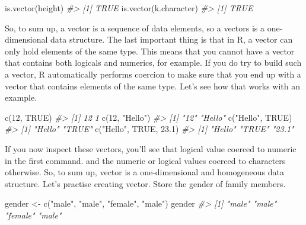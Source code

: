 \documentclass[
]{book}
\newenvironment{Shaded}{\begin{snugshade}}{\end{snugshade}}
\newcommand{\CommentTok}[1]{\textcolor[rgb]{0.56,0.35,0.01}{\textit{#1}}}
\newcommand{\ConstantTok}[1]{\textcolor[rgb]{0.00,0.00,0.00}{#1}}
\newcommand{\DecValTok}[1]{\textcolor[rgb]{0.00,0.00,0.81}{#1}}
\newcommand{\FloatTok}[1]{\textcolor[rgb]{0.00,0.00,0.81}{#1}}
\newcommand{\FunctionTok}[1]{\textcolor[rgb]{0.00,0.00,0.00}{#1}}
\newcommand{\NormalTok}[1]{#1}
\newcommand{\OtherTok}[1]{\textcolor[rgb]{0.56,0.35,0.01}{#1}}
\newcommand{\StringTok}[1]{\textcolor[rgb]{0.31,0.60,0.02}{#1}}
\begin{document}
\begin{Shaded}
\begin{Highlighting}[]
\FunctionTok{is.vector}\NormalTok{(height)}
\CommentTok{\#\textgreater{} [1] TRUE}
\FunctionTok{is.vector}\NormalTok{(k.character)}
\CommentTok{\#\textgreater{} [1] TRUE}
\end{Highlighting}
\end{Shaded}

So, to sum up, a vector is a sequence of data elements, so a vectors is a one-dimensional data structure.
The last important thing is that in R, a vector can only hold elements of the same type. This means that you cannot have a vector that contains both logicals and numerics, for example. If you do try to build such a vector, R automatically performs coercion to make sure that you end up with a vector that contains elements of the same type. Let's see how that works with an example.

\begin{Shaded}
\begin{Highlighting}[]
\FunctionTok{c}\NormalTok{(}\DecValTok{12}\NormalTok{, }\ConstantTok{TRUE}\NormalTok{)}
\CommentTok{\#\textgreater{} [1] 12  1}
\FunctionTok{c}\NormalTok{(}\DecValTok{12}\NormalTok{, }\StringTok{"Hello"}\NormalTok{)}
\CommentTok{\#\textgreater{} [1] "12"    "Hello"}
\FunctionTok{c}\NormalTok{(}\StringTok{"Hello"}\NormalTok{, }\ConstantTok{TRUE}\NormalTok{)}
\CommentTok{\#\textgreater{} [1] "Hello" "TRUE"}
\FunctionTok{c}\NormalTok{(}\StringTok{"Hello"}\NormalTok{, }\ConstantTok{TRUE}\NormalTok{, }\FloatTok{23.1}\NormalTok{)}
\CommentTok{\#\textgreater{} [1] "Hello" "TRUE"  "23.1"}
\end{Highlighting}
\end{Shaded}

If you now inspect these vectors, you'll see that logical value coerced to numeric in the first command. and the numeric or logical values coerced to characters otherwise. So, to sum up, vector is a one-dimensional and homogeneous data structure.
Let's practise creating vector. Store the gender of family members.

\begin{Shaded}
\begin{Highlighting}[]
\NormalTok{gender }\OtherTok{\textless{}{-}} \FunctionTok{c}\NormalTok{(}\StringTok{"male"}\NormalTok{, }\StringTok{"male"}\NormalTok{, }\StringTok{"female"}\NormalTok{, }\StringTok{"male"}\NormalTok{) }
\NormalTok{gender}
\CommentTok{\#\textgreater{} [1] "male"   "male"   "female" "male"}
\end{Highlighting}
\end{Shaded}
\end{document}
